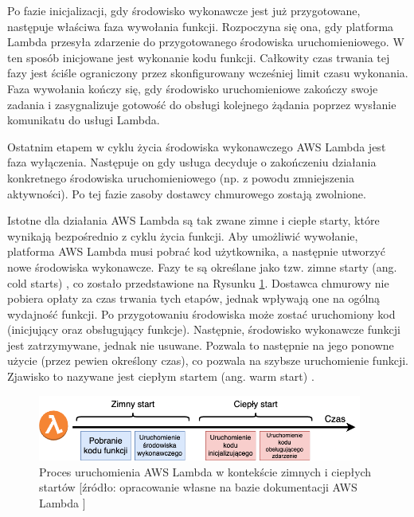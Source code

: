 Po fazie inicjalizacji, gdy środowisko wykonawcze jest już przygotowane, następuje właściwa faza wywołania funkcji.
Rozpoczyna się ona, gdy platforma Lambda przesyła zdarzenie do przygotowanego środowiska uruchomieniowego.
W ten sposób inicjowane jest wykonanie kodu funkcji. 
Całkowity czas trwania tej fazy jest ściśle ograniczony przez skonfigurowany wcześniej limit czasu wykonania. 
Faza wywołania kończy się, gdy środowisko uruchomieniowe zakończy swoje zadania i zasygnalizuje gotowość do obsługi kolejnego żądania poprzez wysłanie komunikatu do usługi Lambda.

Ostatnim etapem w cyklu życia środowiska wykonawczego AWS Lambda jest faza wyłączenia.
Następuje on gdy usługa decyduje o zakończeniu działania konkretnego środowiska uruchomieniowego (np. z powodu zmniejszenia aktywności).
Po tej fazie zasoby dostawcy chmurowego zostają zwolnione.

Istotne dla działania AWS Lambda są tak zwane zimne i ciepłe starty, które wynikają bezpośrednio z cyklu życia funkcji.
Aby umożliwić wywołanie, platforma AWS Lambda musi pobrać kod użytkownika, a następnie utworzyć nowe środowiska wykonawcze.
Fazy te są określane jako tzw. zimne starty (ang. cold starts) \cite{awsLambdaDocs}, co zostało przedstawione na Rysunku \ref{fig:aws_lambda_warm_cold_starts}.
Dostawca chmurowy nie pobiera opłaty za czas trwania tych etapów, jednak wpływają one na ogólną wydajność funkcji.
Po przygotowaniu środowiska może zostać uruchomiony kod (inicjujący oraz obsługujący funkcje).
Następnie, środowisko wykonawcze funkcji jest zatrzymywane, jednak nie usuwane.
Pozwala to następnie na jego ponowne użycie (przez pewien określony czas), co pozwala na szybsze uruchomienie funkcji.
Zjawisko to nazywane jest ciepłym startem (ang. warm start) \cite{awsLambdaDocs}.

\begin{figure}[h]
    \centering
    \includegraphics[width=0.95\textwidth]{charts/warm_cold_starts_lambda.png}
    \caption{Proces uruchomienia AWS Lambda w kontekście zimnych i ciepłych startów [źródło: opracowanie własne na bazie dokumentacji AWS Lambda \cite{awsLambdaDocs}]}
    \label{fig:aws_lambda_warm_cold_starts}    
\end{figure}
